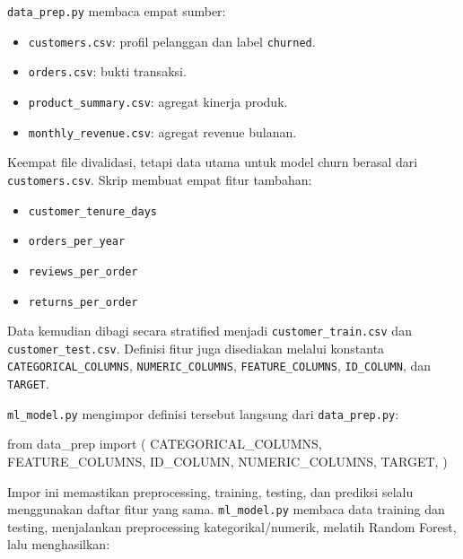 \documentclass[
  indonesian,
  letterpaper,
  DIV=11,
  numbers=noendperiod]{scrreprt}
\newenvironment{Shaded}{\begin{snugshade}}{\end{snugshade}}
\newcommand{\ImportTok}[1]{\textcolor[rgb]{0.00,0.46,0.62}{#1}}
\newcommand{\NormalTok}[1]{\textcolor[rgb]{0.00,0.23,0.31}{#1}}
\providecommand{\tightlist}{%
  \setlength{\itemsep}{0pt}\setlength{\parskip}{0pt}}
\begin{document}
\texttt{data\_prep.py} membaca empat sumber:

\begin{itemize}
\tightlist
\item
  \texttt{customers.csv}: profil pelanggan dan label \texttt{churned}.
\item
  \texttt{orders.csv}: bukti transaksi.
\item
  \texttt{product\_summary.csv}: agregat kinerja produk.
\item
  \texttt{monthly\_revenue.csv}: agregat revenue bulanan.
\end{itemize}

Keempat file divalidasi, tetapi data utama untuk model churn berasal
dari \texttt{customers.csv}. Skrip membuat empat fitur tambahan:

\begin{itemize}
\tightlist
\item
  \texttt{customer\_tenure\_days}
\item
  \texttt{orders\_per\_year}
\item
  \texttt{reviews\_per\_order}
\item
  \texttt{returns\_per\_order}
\end{itemize}

Data kemudian dibagi secara stratified menjadi
\texttt{customer\_train.csv} dan \texttt{customer\_test.csv}. Definisi
fitur juga disediakan melalui konstanta \texttt{CATEGORICAL\_COLUMNS},
\texttt{NUMERIC\_COLUMNS}, \texttt{FEATURE\_COLUMNS},
\texttt{ID\_COLUMN}, dan \texttt{TARGET}.

\texttt{ml\_model.py} mengimpor definisi tersebut langsung dari
\texttt{data\_prep.py}:

\begin{Shaded}
\begin{Highlighting}[]
\ImportTok{from}\NormalTok{ data\_prep }\ImportTok{import}\NormalTok{ (}
\NormalTok{    CATEGORICAL\_COLUMNS,}
\NormalTok{    FEATURE\_COLUMNS,}
\NormalTok{    ID\_COLUMN,}
\NormalTok{    NUMERIC\_COLUMNS,}
\NormalTok{    TARGET,}
\NormalTok{)}
\end{Highlighting}
\end{Shaded}

Impor ini memastikan preprocessing, training, testing, dan prediksi
selalu menggunakan daftar fitur yang sama. \texttt{ml\_model.py} membaca
data training dan testing, menjalankan preprocessing
kategorikal/numerik, melatih Random Forest, lalu menghasilkan:
\end{document}
